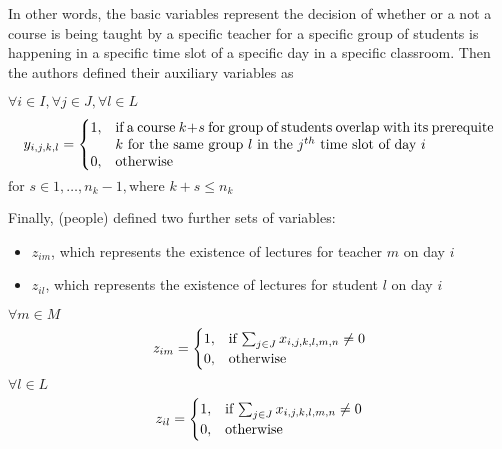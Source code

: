 In other words, the basic variables represent the decision of whether or a not
a course is being taught by a specific teacher for a specific group of students
is happening in a specific time slot of a specific day in a specific classroom.
Then the authors defined their auxiliary variables as

\begin{math}
	\forall i \in I, \forall j \in J, \forall l \in L
\end{math}
\begin{align*}
	y_{i,j,k,l} = 
	\begin{cases}
		1, & \parbox[t]{9.5cm}{if a course \( k + s \) for group of students
		overlap with its prerequite \( k \) for the same group \( l \) in the 
		\( j^{th} \) time slot of day \( i \)} \\
		0, & \text{otherwise}
	\end{cases}	
\end{align*}
\begin{math}
	\text{for } s \in 1, \ldots, n_k - 1, \text{where } k + s \leq n_k	
\end{math}

Finally, (people) defined two further sets of variables:
\begin{itemize}
	\item \( z_{im} \), which represents the existence of lectures for teacher 
		\( m \) on day \( i \)
	\item \( z_{il} \), which represents the existence of lectures for student 
		\( l \) on day \( i \)
\end{itemize}
\begin{math}
	\forall m \in M
\end{math}
\begin{align*}
	z_{im} =
	\begin{cases}
		1, & \text{if \( \sum_{j \in J} x_{i,j,k,l,m,n} \neq 0 \)} \\
		0, & \text{otherwise}
	\end{cases}	
\end{align*}
\begin{math}
	\forall l \in L
\end{math}
\begin{align*}
	z_{il} =
	\begin{cases}
		1, & \text{if \( \sum_{j \in J} x_{i,j,k,l,m,n} \neq 0 \)} \\
		0, & \text{otherwise}
	\end{cases}	
\end{align*}

